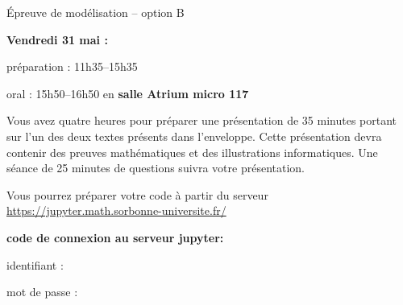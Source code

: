 \documentclass{article}
\begin{document}
\begin{center}
  {\Large \'Epreuve de mod\'elisation -- option B}
\end{center}

\vspace{4cm}

\noindent
\textbf{Vendredi 31 mai :}

\vspace{1cm}

\noindent
pr\'eparation : 11h35--15h35

\vspace{1cm}

\noindent
oral : 15h50--16h50 en \textbf{salle Atrium micro 117}

\vspace{2cm}

\noindent
Vous avez quatre heures pour pr\'eparer une pr\'esentation de 35 minutes
portant sur l'un des deux textes pr\'esents dans l'enveloppe.
Cette pr\'esentation devra contenir des preuves math\'ematiques et des illustrations informatiques.
Une s\'eance de 25 minutes de questions suivra votre pr\'esentation.

\vspace{2cm}
\noindent
Vous pourrez pr\'eparer votre code \`a partir du serveur
\\
\url{https://jupyter.math.sorbonne-universite.fr/}

\vspace{2cm}
\noindent
\textbf{code de connexion au serveur jupyter:}

\noindent
identifiant :

\noindent
mot de passe :
\end{document}
